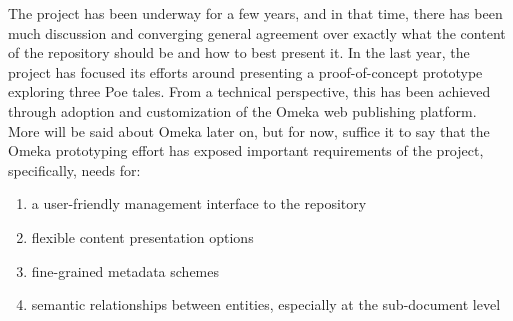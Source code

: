 The \apc project has been underway for a few years, and in that time, there has been much discussion and converging general agreement over exactly what the content of the repository should be and how to best present it. In the last year, the project has focused its efforts around presenting a proof-of-concept prototype exploring three Poe tales. From a technical perspective, this has been achieved through adoption and customization of the Omeka web publishing platform. More will be said about Omeka later on, but for now, suffice it to say that the Omeka prototyping effort has exposed important requirements of the project, specifically, needs for:
\begin{enumerate}
  \item{a user-friendly management interface to the repository}
  \item{flexible content presentation options}
  \item{fine-grained metadata schemes}
  \item{semantic relationships between entities, especially at the sub-document level}
\end{enumerate}